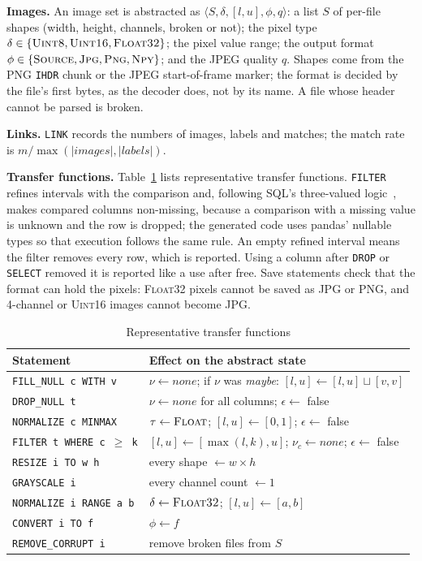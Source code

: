 \documentclass[conference]{IEEEtran}
\begin{document}
\textbf{Images.} An image set is abstracted as $\langle S, \delta, [l,u], \phi, q\rangle$: a list
$S$ of per-file shapes (width, height, channels, broken or not); the pixel type
$\delta \in \{\textsc{Uint8}, \textsc{Uint16}, \textsc{Float32}\}$; the pixel value range; the
output format $\phi \in \{\textsc{Source}, \textsc{Jpg}, \textsc{Png}, \textsc{Npy}\}$; and the
JPEG quality $q$. Shapes come from the PNG \texttt{IHDR} chunk or the JPEG start-of-frame marker;
the format is decided by the file's first bytes, as the decoder does, not by its name. A file whose
header cannot be parsed is broken.

\textbf{Links.} \texttt{LINK} records the numbers of images, labels and matches; the match rate is
$m/\max(|\mathit{images}|, |\mathit{labels}|)$.

\textbf{Transfer functions.} Table~\ref{tab:transfer} lists representative transfer functions.
\texttt{FILTER} refines intervals with the comparison and, following SQL's three-valued
logic~\cite{codd1979}, makes compared columns non-missing, because a comparison with a missing
value is unknown and the row is dropped; the generated code uses pandas' nullable types so that
execution follows the same rule. An empty refined interval means the filter removes every row,
which is reported. Using a column after \texttt{DROP} or \texttt{SELECT} removed it is reported
like a use after free. Save statements check that the format can hold the pixels:
\textsc{Float32} pixels cannot be saved as JPG or PNG, and 4-channel or \textsc{Uint16} images
cannot become JPG.

\begin{table}[t]
\caption{Representative transfer functions}
\label{tab:transfer}
\centering
\footnotesize
\begin{tabular}{@{}l>{\raggedright\arraybackslash}p{4.85cm}@{}}
\toprule
Statement & Effect on the abstract state \\
\midrule
\texttt{FILL\_NULL c WITH v} & $\nu \gets \textit{none}$; if $\nu$ was \textit{maybe}:
  $[l,u] \gets [l,u] \sqcup [v,v]$ \\
\texttt{DROP\_NULL t} & $\nu \gets \textit{none}$ for all columns; $\epsilon \gets$ false \\
\texttt{NORMALIZE c MINMAX} & $\tau \gets \textsc{Float}$; $[l,u] \gets [0,1]$; $\epsilon \gets$ false \\
\texttt{FILTER t WHERE c $\ge$ k} & $[l,u] \gets [\max(l,k), u]$; $\nu_c \gets \textit{none}$;
  $\epsilon \gets$ false \\
\texttt{RESIZE i TO w h} & every shape $\gets w \times h$ \\
\texttt{GRAYSCALE i} & every channel count $\gets 1$ \\
\texttt{NORMALIZE i RANGE a b} & $\delta \gets \textsc{Float32}$; $[l,u] \gets [a,b]$ \\
\texttt{CONVERT i TO f} & $\phi \gets f$ \\
\texttt{REMOVE\_CORRUPT i} & remove broken files from $S$ \\
\bottomrule
\end{tabular}
\end{table}
\end{document}
